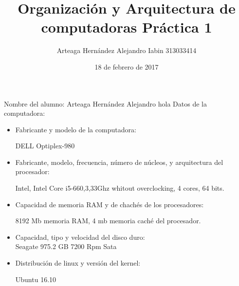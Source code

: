 \documentclass[12pt, letterpaper, twoside]{article}
\title{Organizaci\'on y Arquitectura de computadoras Práctica 1}
\author{Arteaga Hernández Alejandro Iabin 313033414}
\date{18 de febrero de 2017}
\begin{document}
 
\maketitle

Nombre del alumno: Arteaga Hernández Alejandro  
hola
Datos de la computadora:
\begin{itemize}
    \item Fabricante y modelo de la computadora:
     
          DELL Optiplex-980
    \item Fabricante, modelo, frecuencia, número de núcleos, y arquitectura del procesador:
    
    Intel, Intel Core i5-660,3,33Ghz whitout overclocking, 4 cores, 64 bits.
    \item Capacidad de memoria RAM y de chachés de los procesadores:
    
    8192 Mb memoria RAM, 4 mb memoria caché del procesador.
    \item Capacidad, tipo y velocidad del disco duro:\\
    Seagate 975.2 GB  7200 Rpm Sata 
    
    \item Distribución de linux y versión del kernel:
    
    Ubuntu 16.10
\end{itemize}
\end{document}
